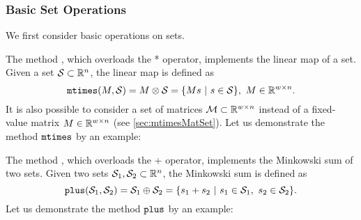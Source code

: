 \subsubsection{Basic Set Operations}

We first consider basic operations on sets.

\label{sec:mtimes}

The method , which overloads the * operator, implements the linear map of a set. Given a set $\mathcal{S} \subset \mathbb{R}^n$, the linear map is defined as 
\begin{equation*}
	{\normalfont \texttt{mtimes}}(M,\mathcal{S}) = M \otimes \mathcal{S} = \{ M s ~|~ s \in \mathcal{S} \},~ M \in \mathbb{R}^{w \times n}.
\end{equation*}
It is also possible to consider a set of matrices $\mathcal{M} \subset \mathbb{R}^{w \times n}$ instead of a fixed-value matrix $M \in \mathbb{R}^{w \times n}$ (see \cref{sec:mtimesMatSet}). Let us demonstrate the method ${\normalfont \texttt{mtimes}}$ by an example:

\begin{center}
\begin{minipage}[t]{0.35\textwidth}
	\vspace{10pt}
	\footnotesize
	
\end{minipage}
\begin{minipage}[t]{0.6\textwidth}
	\vspace{0pt}
	\centering
\end{minipage}
\end{center}


\label{sec:plus}

The method , which overloads the + operator, implements the Minkowski sum of two sets. Given two sets $\mathcal{S}_1,\mathcal{S}_2 \subset \mathbb{R}^n$, the Minkowski sum is defined as 
\begin{equation*}
	{\normalfont \texttt{plus}}(\mathcal{S}_1,\mathcal{S}_2) = \mathcal{S}_1 \oplus \mathcal{S}_2 = \{ s_1 + s_2 ~|~ s_1 \in \mathcal{S}_1,~ s_2 \in \mathcal{S}_2 \}.
\end{equation*}
Let us demonstrate the method ${\normalfont \texttt{plus}}$ by an example:

\begin{center}
\begin{minipage}[t]{0.35\textwidth}
	\vspace{10pt}
	\footnotesize
	
\end{minipage}
\begin{minipage}[t]{0.6\textwidth}
	\vspace{0pt}
	\centering
\end{minipage}
\end{center}



